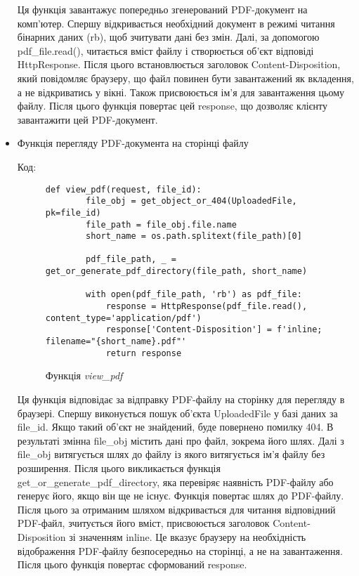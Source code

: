 \documentclass[a4paper,14pt]{extarticle}
\numberwithin{figure}{section}
\begin{document}
\begin{itemize}
    Ця функція завантажує попередньо згенерований PDF-документ на комп'ютер. Спершу відкривається необхідний документ в режимі читання бінарних даних (rb), щоб зчитувати дані без змін. Далі, за допомогою pdf\_file.read(), читається вміст файлу і створюється об'єкт відповіді HttpResponse. Після цього встановлюється заголовок Content-Disposition, який повідомляє браузеру, що файл повинен бути завантажений як вкладення, а не відкриватись у вікні. Також присвоюється ім'я для завантаження цьому файлу. Після цього функція повертає цей response, що дозволяє клієнту завантажити цей PDF-документ.

    \newpage
    \item Функція перегляду PDF-документа на сторінці файлу

    Код:
    \begin{figure}[h]
    \centering
    \begin{lstlisting}[style=mystyle]
    def view_pdf(request, file_id):
        file_obj = get_object_or_404(UploadedFile, pk=file_id)
        file_path = file_obj.file.name
        short_name = os.path.splitext(file_path)[0]
    
        pdf_file_path, _ = get_or_generate_pdf_directory(file_path, short_name)
    
        with open(pdf_file_path, 'rb') as pdf_file:
            response = HttpResponse(pdf_file.read(), content_type='application/pdf')
            response['Content-Disposition'] = f'inline; filename="{short_name}.pdf"'
            return response
    \end{lstlisting}
    \caption{\normalsize Функція \textit{view\_pdf}}
    \end{figure}

    Ця функція відповідає за відправку PDF-файлу на сторінку для перегляду в браузері. Спершу виконується пошук об'єкта UploadedFile у базі даних за file\_id. Якщо такий об'єкт не знайдений, буде повернено помилку 404. В результаті змінна file\_obj містить дані про файл, зокрема його шлях. Далі з file\_obj витягується шлях до файлу із якого витягується ім'я файлу без розширення. Після цього викликається функція get\_or\_generate\_pdf\_directory, яка перевіряє наявність PDF-файлу або генерує його, якщо він ще не існує. Функція повертає шлях до PDF-файлу. Після цього за отриманим шляхом відкривається для читання відповідний PDF-файл, зчитується його вміст, присвоюється заголовок Content-Disposition зі значенням inline. Це вказує браузеру на необхідність відображення PDF-файлу безпосередньо на сторінці, а не на завантаження. Після цього функція повертає сформований response.

    \end{itemize}
    
\end{document}
